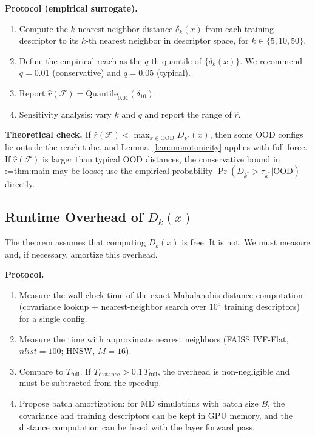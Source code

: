 \documentclass[11pt,a4paper]{article}
\makeatletter
\newcommand{\cref}[1]{\begingroup\def\crefsep{}\@for\crefitem:=#1\do{\crefsep\ref{\crefitem}\def\crefsep{, }}\endgroup}
\makeatother
\begin{document}
\textbf{Protocol (empirical surrogate).}
\begin{enumerate}
    \item Compute the $k$-nearest-neighbor distance $\delta_k(x)$ from each training descriptor to its $k$-th nearest neighbor in descriptor space, for $k\in\{5,10,50\}$.
    \item Define the empirical reach as the $q$-th quantile of $\{\delta_k(x)\}$. We recommend $q=0.01$ (conservative) and $q=0.05$ (typical).
    \item Report $\hat r(\mathcal{F}) = \text{Quantile}_{0.01}(\delta_{10})$.
    \item Sensitivity analysis: vary $k$ and $q$ and report the range of $\hat r$.
\end{enumerate}

\textbf{Theoretical check.} If $\hat r(\mathcal{F}) < \max_{x\in\text{OOD}} D_{k^*}(x)$, then some OOD configs lie outside the reach tube, and Lemma~\ref{lem:monotonicity} applies with full force. If $\hat r(\mathcal{F})$ is larger than typical OOD distances, the conservative bound in \cref{thm:main} may be loose; use the empirical probability $\Pr(D_{k^*}>\tau_{k^*}|\text{OOD})$ directly.

\subsection{Runtime Overhead of $D_k(x)$}\label{sec:empirical:overhead}

The theorem assumes that computing $D_k(x)$ is free. It is not. We must measure and, if necessary, amortize this overhead.

\textbf{Protocol.}
\begin{enumerate}
    \item Measure the wall-clock time of the exact Mahalanobis distance computation (covariance lookup + nearest-neighbor search over $10^5$ training descriptors) for a single config.
    \item Measure the time with approximate nearest neighbors (FAISS IVF-Flat, $nlist=100$; HNSW, $M=16$).
    \item Compare to $T_{\text{full}}$. If $T_{\text{distance}} > 0.1\,T_{\text{full}}$, the overhead is non-negligible and must be subtracted from the speedup.
    \item Propose batch amortization: for MD simulations with batch size $B$, the covariance and training descriptors can be kept in GPU memory, and the distance computation can be fused with the layer forward pass.
\end{enumerate}
\end{document}
